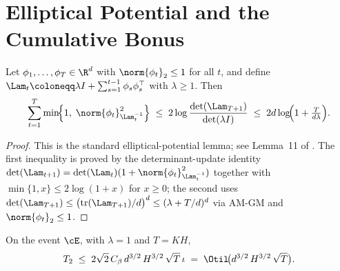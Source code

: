 \section{Elliptical Potential and the Cumulative Bonus}\label{sec:elliptical}

\begin{lemma}\label{lem:elliptical}
Let $\phi_1, \ldots, \phi_T \in \R^d$ with $\norm{\phi_t}_2 \le 1$ for all $t$, and define $\Lam_t \coloneqq \lambda I + \sum_{s=1}^{t-1} \phi_s \phi_s^\top$ with $\lambda \ge 1$. Then
\begin{align}\label{eq:elliptical_sum}
\sum_{t=1}^T \min\!\Bigl\{1,\; \norm{\phi_t}_{\Lam_t^{-1}}^2 \Bigr\}
\;\le\; 2 \log \frac{\det(\Lam_{T+1})}{\det(\lambda I)}
\;\le\; 2 d \log\!\Bigl(1 + \tfrac{T}{d \lambda}\Bigr).
\end{align}
\end{lemma}

\begin{proof}
This is the standard elliptical-potential lemma; see Lemma~11 of \cite{abbasi2011improved}. The first inequality is proved by the determinant-update identity $\det(\Lam_{t+1}) = \det(\Lam_t) (1 + \norm{\phi_t}_{\Lam_t^{-1}}^2)$ together with $\min\{1, x\} \le 2 \log(1 + x)$ for $x \ge 0$; the second uses $\det(\Lam_{T+1}) \le \bigl( \mathrm{tr}(\Lam_{T+1})/d \bigr)^d \le (\lambda + T/d)^d$ via AM-GM and $\norm{\phi_t}_2 \le 1$.
\end{proof}

\begin{lemma}[Bound on $T_2$]\label{lem:T2_bound}
On the event $\cE$, with $\lambda = 1$ and $T = K H$,
\begin{align}\label{eq:T2_bound_final}
T_2 \;\le\; 2 \sqrt{2}\, C_\beta\, d^{3/2}\, H^{3/2}\, \sqrt{T}\, \iota
\;=\; \Otil\!\bigl( d^{3/2}\, H^{3/2}\, \sqrt{T} \bigr).
\end{align}
\end{lemma}

